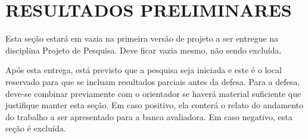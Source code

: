 \section{RESULTADOS PRELIMINARES}

Esta seção estará em vazia na primeira versão de projeto a ser entregue na disciplina Projeto de Pesquisa. Deve ficar vazia mesmo, não sendo excluída.

Após esta entrega, está previsto que a pesquisa seja iniciada e este é o local reservado para que se incluam resultados parciais antes da defesa. Para a defesa, deve-se combinar previamente com o orientador se haverá material suficiente que justifique manter esta seção. Em caso positivo, ela conterá o relato do andamento do trabalho a ser apresentado para a banca avaliadora. Em caso negativo, esta seção é excluída.